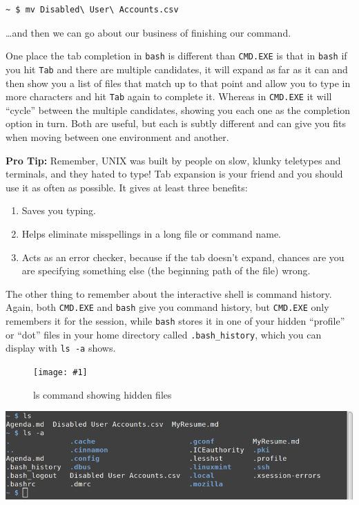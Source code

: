 \documentclass[10pt,]{book}
\numberwithin{figure}{chapter}
\DeclareRobustCommand{\fimg}[3]{
\ifxetex
\begin{figure}[H]
\texttt{[image: \#1]}
\caption{#2}
\label{fig:#3}
\end{figure}
\fi}
\DeclareRobustCommand{\fref}[1]{\ifxetex{(Figure \ref{fig:#1})}\fi}
\begin{document}
\begin{verbatim}
~ $ mv Disabled\ User\ Accounts.csv
\end{verbatim}

\ldots{}and then we can go about our business of finishing our command.

One place the tab completion in \texttt{bash} is different than
\texttt{CMD.EXE} is that in \texttt{bash} if you hit \texttt{Tab} and
there are multiple candidates, it will expand as far as it can and then
show you a list of files that match up to that point and allow you to
type in more characters and hit \texttt{Tab} again to complete it.
Whereas in \texttt{CMD.EXE} it will ``cycle'' between the multiple
candidates, showing you each one as the completion option in turn. Both
are useful, but each is subtly different and can give you fits when
moving between one environment and another.

\textbf{Pro Tip:} Remember, UNIX was built by people on slow, klunky
teletypes and terminals, and they hated to type! Tab expansion is your
friend and you should use it as often as possible. It gives at least
three benefits:

\begin{enumerate}
\def\labelenumi{\arabic{enumi}.}
\item
  Saves you typing.
\item
  Helps eliminate misspellings in a long file or command name.
\item
  Acts as an error checker, because if the tab doesn't expand, chances
  are you are specifying something else (the beginning path of the file)
  wrong.
\end{enumerate}

The other thing to remember about the interactive shell is command
history. Again, both \texttt{CMD.EXE} and \texttt{bash} give you command
history, but \texttt{CMD.EXE} only remembers it for the session, while
\texttt{bash} stores it in one of your hidden ``profile'' or ``dot''
files in your home directory called \texttt{.bash\_history}, which you
can display with \texttt{ls -a} \fref{ls-a} shows.

\ifxetex\fimg{./images/ls-a.png}{ls command showing hidden files}{ls-a}
\else
\includegraphics{./images/ls-a.png} \fi
\end{document}
